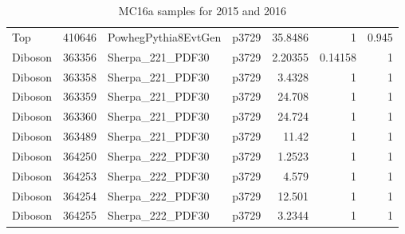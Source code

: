 \begin{table}[h]
\begin{center}
\begin{tabular}{ l|rllrrr }
 Top                       & 410646 & PowhegPythia8EvtGen & p3729   &    35.8486  &   1       &    0.945   \\
 Diboson                   & 363356 & Sherpa\_221\_PDF30    & p3729   &     2.20355 &   0.14158 &    1       \\
 Diboson                   & 363358 & Sherpa\_221\_PDF30    & p3729   &     3.4328  &   1       &    1       \\
 Diboson                   & 363359 & Sherpa\_221\_PDF30    & p3729   &    24.708   &   1       &    1       \\
 Diboson                   & 363360 & Sherpa\_221\_PDF30    & p3729   &    24.724   &   1       &    1       \\
 Diboson                   & 363489 & Sherpa\_221\_PDF30    & p3729   &    11.42    &   1       &    1       \\
 Diboson                   & 364250 & Sherpa\_222\_PDF30    & p3729   &     1.2523  &   1       &    1       \\
 Diboson                   & 364253 & Sherpa\_222\_PDF30    & p3729   &     4.579   &   1       &    1       \\
 Diboson                   & 364254 & Sherpa\_222\_PDF30    & p3729   &    12.501   &   1       &    1       \\
 Diboson                   & 364255 & Sherpa\_222\_PDF30    & p3729   &     3.2344  &   1       &    1       \\
\hline
\end{tabular}
\caption{
 MC16a samples for 2015 and 2016
}%
\label{tbl:mc_samples_ewk}
\end{center}
\end{table}



